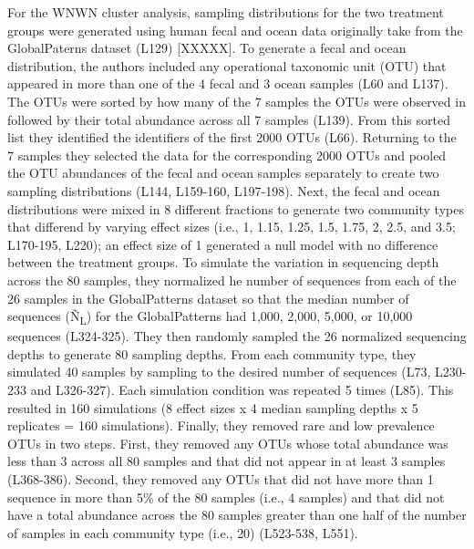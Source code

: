 \documentclass[
]{article}
\begin{document}
For the WNWN cluster analysis, sampling distributions for the two
treatment groups were generated using human fecal and ocean data
originally take from the GlobalPaterns dataset (L129) {[}XXXXX{]}. To
generate a fecal and ocean distribution, the authors included any
operational taxonomic unit (OTU) that appeared in more than one of the 4
fecal and 3 ocean samples (L60 and L137). The OTUs were sorted by how
many of the 7 samples the OTUs were observed in followed by their total
abundance across all 7 samples (L139). From this sorted list they
identified the identifiers of the first 2000 OTUs (L66). Returning to
the 7 samples they selected the data for the corresponding 2000 OTUs and
pooled the OTU abundances of the fecal and ocean samples separately to
create two sampling distributions (L144, L159-160, L197-198). Next, the
fecal and ocean distributions were mixed in 8 different fractions to
generate two community types that differend by varying effect sizes
(i.e., 1, 1.15, 1.25, 1.5, 1.75, 2, 2.5, and 3.5; L170-195, L220); an
effect size of 1 generated a null model with no difference between the
treatment groups. To simulate the variation in sequencing depth across
the 80 samples, they normalized he number of sequences from each of the
26 samples in the GlobalPatterns dataset so that the median number of
sequences (Ñ\textsubscript{L}) for the GlobalPatterns had 1,000, 2,000,
5,000, or 10,000 sequences (L324-325). They then randomly sampled the 26
normalized sequencing depths to generate 80 sampling depths. From each
community type, they simulated 40 samples by sampling to the desired
number of sequences (L73, L230-233 and L326-327). Each simulation
condition was repeated 5 times (L85). This resulted in 160 simulations
(8 effect sizes x 4 median sampling depths x 5 replicates = 160
simulations). Finally, they removed rare and low prevalence OTUs in two
steps. First, they removed any OTUs whose total abundance was less than
3 across all 80 samples and that did not appear in at least 3 samples
(L368-386). Second, they removed any OTUs that did not have more than 1
sequence in more than 5\% of the 80 samples (i.e., 4 samples) and that
did not have a total abundance across the 80 samples greater than one
half of the number of samples in each community type (i.e., 20)
(L523-538, L551).
\end{document}
